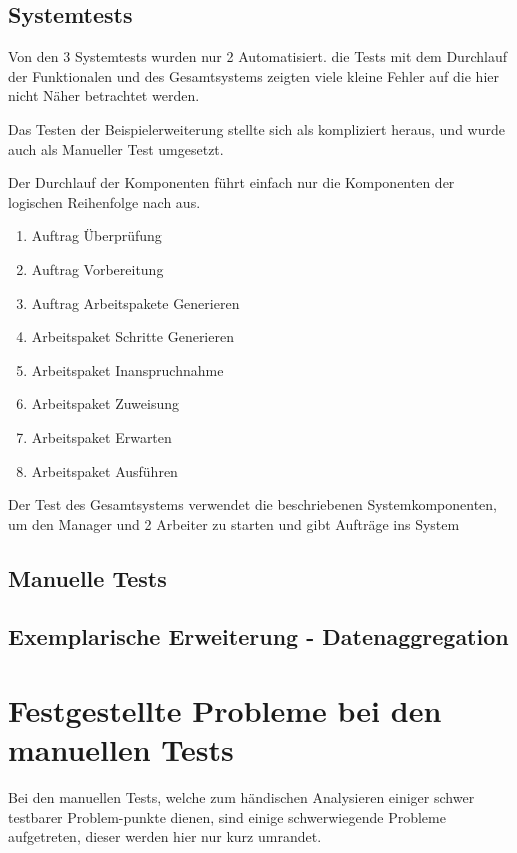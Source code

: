 \subsection{Systemtests}

Von den 3 Systemtests wurden nur 2 Automatisiert.
die Tests mit dem Durchlauf der Funktionalen  und des Gesamtsystems
zeigten viele kleine Fehler auf die hier nicht Näher betrachtet werden.

Das Testen der Beispielerweiterung stellte sich als kompliziert heraus, und wurde auch als Manueller Test umgesetzt.

Der Durchlauf der Komponenten führt einfach nur die Komponenten der logischen Reihenfolge nach aus.
\begin{enumerate}
    \item Auftrag Überprüfung
    \item Auftrag Vorbereitung
    \item Auftrag Arbeitspakete Generieren
    \item Arbeitspaket Schritte Generieren
    \item Arbeitspaket Inanspruchnahme
    \item Arbeitspaket Zuweisung
    \item Arbeitspaket Erwarten
    \item Arbeitspaket Ausführen
\end{enumerate}

Der Test des Gesamtsystems verwendet die beschriebenen Systemkomponenten, um den Manager und 2 Arbeiter zu starten und gibt Aufträge ins System

\subsection{Manuelle Tests}

\subsection{Exemplarische Erweiterung - Datenaggregation}




\section{Festgestellte Probleme bei den manuellen Tests}

Bei den manuellen Tests, welche zum händischen Analysieren
einiger schwer testbarer Problem-punkte dienen,
sind einige schwerwiegende Probleme aufgetreten,
dieser werden hier nur kurz umrandet.

